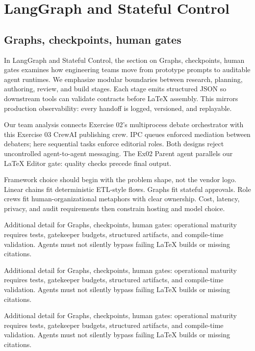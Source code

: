 \section{LangGraph and Stateful Control}

\subsection{Graphs, checkpoints, human gates}
In LangGraph and Stateful Control, the section on Graphs, checkpoints, human gates examines how engineering teams move from prototype prompts to auditable agent runtimes. We emphasize modular boundaries between research, planning, authoring, review, and build stages. Each stage emits structured JSON so downstream tools can validate contracts before LaTeX assembly. This mirrors production observability: every handoff is logged, versioned, and replayable. \cite{crewai2024} \cite{langgraph2024} \cite{mcp2024}

Our team analysis connects Exercise 02's multiprocess debate orchestrator with this Exercise 03 CrewAI publishing crew. IPC queues enforced mediation between debaters; here sequential tasks enforce editorial roles. Both designs reject uncontrolled agent-to-agent messaging. The Ex02 Parent agent parallels our LaTeX Editor gate: quality checks precede final output. \cite{crewai2024} \cite{langgraph2024} \cite{mcp2024}

Framework choice should begin with the problem shape, not the vendor logo. Linear chains fit deterministic ETL-style flows. Graphs fit stateful approvals. Role crews fit human-organizational metaphors with clear ownership. Cost, latency, privacy, and audit requirements then constrain hosting and model choice. \cite{crewai2024} \cite{langgraph2024} \cite{mcp2024}

Additional detail for Graphs, checkpoints, human gates: operational maturity requires tests, gatekeeper budgets, structured artifacts, and compile-time validation. Agents must not silently bypass failing LaTeX builds or missing citations. \cite{crewai2024} \cite{langgraph2024} \cite{mcp2024}

Additional detail for Graphs, checkpoints, human gates: operational maturity requires tests, gatekeeper budgets, structured artifacts, and compile-time validation. Agents must not silently bypass failing LaTeX builds or missing citations. \cite{crewai2024} \cite{langgraph2024} \cite{mcp2024}

Additional detail for Graphs, checkpoints, human gates: operational maturity requires tests, gatekeeper budgets, structured artifacts, and compile-time validation. Agents must not silently bypass failing LaTeX builds or missing citations. \cite{crewai2024} \cite{langgraph2024} \cite{mcp2024}

